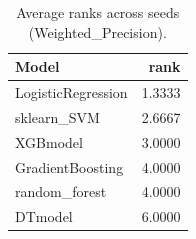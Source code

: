 \begin{table}[t]
\centering
\begin{tabular}{lr}
\toprule
Model & rank \\
\midrule
LogisticRegression & 1.3333 \\
sklearn_SVM & 2.6667 \\
XGBmodel & 3.0000 \\
GradientBoosting & 4.0000 \\
random_forest & 4.0000 \\
DTmodel & 6.0000 \\
\bottomrule
\end{tabular}
\caption{Average ranks across seeds (Weighted_Precision).}
\label{tab:avg_rank_Weighted_Precision}
\end{table}